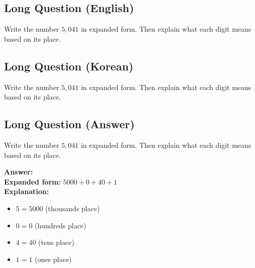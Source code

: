 \cleardoublepage
\subsection*{Long Question (English)}
Write the number $5{,}041$ in expanded form. Then explain what each digit means based on its place.


\newpage
\subsection*{Long Question (Korean)}
Write the number $5{,}041$ in expanded form. Then explain what each digit means based on its place.


\newpage
\subsection*{Long Question (Answer)}
Write the number $5{,}041$ in expanded form. Then explain what each digit means based on its place.

\textbf{Answer:}\\
\textbf{Expanded form:} $5000 + 0 + 40 + 1$\\
\textbf{Explanation:}
\begin{itemize}
  \item $5 = 5000$ (thousands place)
  \item $0 = 0$ (hundreds place)
  \item $4 = 40$ (tens place)
  \item $1 = 1$ (ones place)
\end{itemize}
